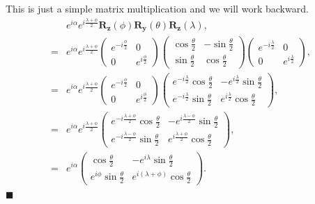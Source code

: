 \documentclass{article}
\begin{document}
This is just a simple matrix multiplication and we will work backward.
\begin{align*}\label{eq 5.27}
    &e^{i\alpha}e^{i\frac{\lambda+\phi}{2}}\boldsymbol{R_z}(\phi)\boldsymbol{R_y}(\theta)\boldsymbol{R_z}(\lambda),\\
    =&e^{i\alpha}e^{i\frac{\lambda+\phi}{2}}
    \begin{pmatrix}
        e^{-i\frac{\phi}{2}}&0\\0&e^{i\frac{\phi}{2}}
    \end{pmatrix}
    \begin{pmatrix}
        \cos{\frac{\theta}{2}}& -\sin{\frac{\theta}{2}}\\
        \sin{\frac{\theta}{2}}&\cos{\frac{\theta}{2}}
    \end{pmatrix}
    \begin{pmatrix}
        e^{-i\frac{\lambda}{2}}&0\\0&e^{i\frac{\lambda}{2}}
    \end{pmatrix},\\
    =&e^{i\alpha}e^{i\frac{\lambda+\phi}{2}}
    \begin{pmatrix}
        e^{-i\frac{\phi}{2}}&0\\0&e^{i\frac{\phi}{2}}
    \end{pmatrix}
    \begin{pmatrix}
        e^{-i\frac{\lambda}{2}}\cos{\frac{\theta}{2}}&-e^{i\frac{\lambda}{2}}\sin{\frac{\theta}{2}}\\
        e^{-i\frac{\lambda}{2}}\sin{\frac{\theta}{2}}&e^{i\frac{\lambda}{2}}\cos{\frac{\theta}{2}}
    \end{pmatrix},\\
    =&e^{i\alpha}e^{i\frac{\lambda+\phi}{2}}\begin{pmatrix}
        e^{-i\frac{\lambda+\phi}{2}}\cos{\frac{\theta}{2}}&-e^{i\frac{\lambda-\phi}{2}}\sin{\frac{\theta}{2}}\\
        e^{-i\frac{\lambda-\phi}{2}}\sin{\frac{\theta}{2}}&e^{i\frac{\lambda+\phi}{2}}\cos{\frac{\theta}{2}}
    \end{pmatrix},\\
    =&e^{i\alpha}\begin{pmatrix}
        \cos{\frac{\theta}{2}}&-e^{i\lambda}\sin{\frac{\theta}{2}}\\
        e^{i\phi}\sin{\frac{\theta}{2}}&e^{i(\lambda+\phi)}\cos{\frac{\theta}{2}}
    \end{pmatrix}. \tag{5.27}
\end{align*}
\hfill $\blacksquare$\\\\
\end{document}
